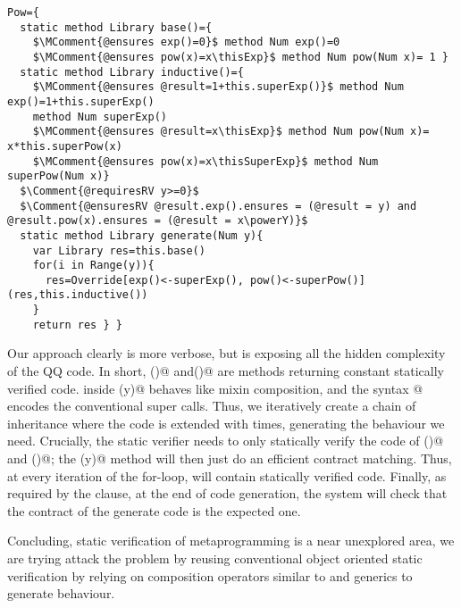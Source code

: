 \documentclass[a4paper,twoside,british,9pt]{extarticle}
\begin{document}
\begin{lstlisting}[language=FortyTwo]
Pow={
  static method Library base()={
    $\MComment{@ensures exp()=0}$ method Num exp()=0 
    $\MComment{@ensures pow(x)=x\thisExp}$ method Num pow(Num x)= 1 }
  static method Library inductive()={
    $\MComment{@ensures @result=1+this.superExp()}$ method Num exp()=1+this.superExp() 
    method Num superExp()
    $\MComment{@ensures @result=x\thisExp}$ method Num pow(Num x)= x*this.superPow(x)
    $\MComment{@ensures pow(x)=x\thisSuperExp}$ method Num superPow(Num x)}
  $\Comment{@requiresRV y>=0}$
  $\Comment{@ensuresRV @result.exp().ensures = (@result = y) and @result.pow(x).ensures = (@result = x\powerY)}$
  static method Library generate(Num y){
    var Library res=this.base()
    for(i in Range(y)){
      res=Override[exp()<-superExp(), pow()<-superPow()](res,this.inductive())
    }
    return res } }
\end{lstlisting}
Our approach clearly is more verbose, but is exposing all the hidden complexity
of the QQ code.
In short, \Q@base()@ and\Q@inductive()@ 
are methods returning constant statically verified code.
\Q@Override@ inside \Q@generate(y)@ behaves like mixin composition,
and the syntax @ encodes the
conventional super calls.
Thus, we iteratively create a chain of inheritance where
the \Q@base@ code is extended with \Q@inductive@ \Q@y@
times, generating the behaviour we need.
Crucially, the static verifier needs to only statically verify the
code of \Q@base()@ and \Q@inductive()@;
the \Q@generate(y)@ method will then just do
an efficient contract matching.
Thus, at every iteration of the for-loop, \Q@res@
will contain statically verified code.
Finally, as required by the \Q@ensureRV@ clause, at the end of code generation, the system will
check that the contract of the generate code is the expected one.

Concluding, static verification of metaprogramming is a
near unexplored area, we are trying attack the problem by reusing conventional
object oriented static verification by
relying on
composition operators similar to \Q@extends@ and generics to
generate behaviour.
 
\end{document}
